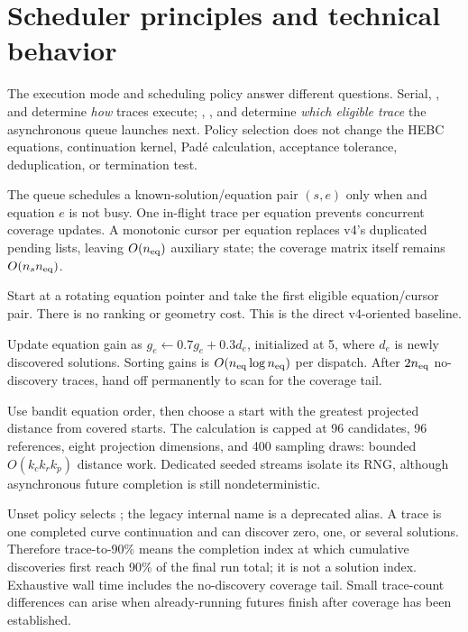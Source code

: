 \section{Scheduler principles and technical behavior}

The execution mode and scheduling policy answer different questions. Serial,
, and  determine \emph{how} traces execute;
, , and  determine \emph{which eligible
trace} the asynchronous  queue launches next. Policy selection
does not change the HEBC equations, continuation kernel, Pad\'e calculation,
acceptance tolerance, deduplication, or termination test.

The queue schedules a known-solution/equation pair $(s,e)$ only when
 and equation $e$ is not busy. One in-flight trace per
equation prevents concurrent coverage updates. A monotonic cursor per equation
replaces v4's duplicated pending lists, leaving $O(n_{\rm eq})$ auxiliary state;
the coverage matrix itself remains $O(n_s n_{\rm eq})$.

\begin{description}[leftmargin=0em,style=nextline]
\item[\code{scan}: rotating fairness.] Start at a rotating equation pointer and
take the first eligible equation/cursor pair. There is no ranking or geometry
cost. This is the direct v4-oriented baseline.
\item[\code{bandit}: learned productivity (default).] Update equation gain as
$g_e\leftarrow0.7g_e+0.3d_e$, initialized at 5, where $d_e$ is newly discovered
solutions. Sorting gains is $O(n_{\rm eq}\log n_{\rm eq})$ per dispatch. After
$2n_{\rm eq}$ no-discovery traces, hand off permanently to scan for the coverage
tail.
\item[\code{novelty}: separated starts.] Use bandit equation order, then choose
a start with the greatest projected distance from covered starts. The calculation
is capped at 96 candidates, 96 references, eight projection dimensions, and 400
sampling draws: bounded $O(k_c k_r k_p)$ distance work. Dedicated seeded streams
isolate its RNG, although asynchronous future completion is still nondeterministic.
\end{description}

Unset policy selects ; the legacy internal name  is a
deprecated alias. A trace is one completed curve continuation and can discover
zero, one, or several solutions. Therefore trace-to-90\% means the completion
index at which cumulative discoveries first reach 90\% of the final run total;
it is not a solution index. Exhaustive wall time includes the no-discovery
coverage tail. Small trace-count differences can arise when already-running
futures finish after coverage has been established.

